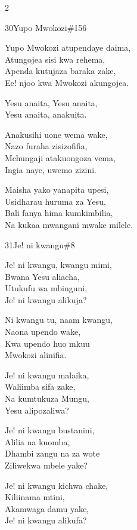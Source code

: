\begin{multicols}{2}
\begin{hymn}{30}{Yupo Mwokozi}{\#156}
\begin{stanza}
Yupo Mwokozi atupendaye daima,\\
Atungojea sisi kwa rehema,\\
Apenda kutujaza baraka zake,\\
Ee! njoo kwa Mwokozi akungojea.
\end{stanza}
\begin{chorus}
Yesu anaita, Yesu anaita,\\
Yesu anaita, anakuita.
\end{chorus}
\begin{stanza}
Anakusihi uone wema wake,\\
Nazo furaha zisizofifia,\\
Mchungaji atakuongoza vema,\\
Ingia naye, uwemo zizini.
\end{stanza}
\begin{stanza}
Maisha yako yanapita upesi,\\
Usidharau huruma za Yesu,\\
Bali fanya hima kumkimbilia,\\
Na kukaa mwangani mwake milele.
\end{stanza}
\end{hymn}

\begin{hymn}{31}{Je! ni kwangu}{\#8}
\begin{stanza}
Je! ni kwangu, kwangu mimi,\\
Bwana Yesu aliacha,\\
Utukufu wa mbinguni,\\
Je! ni kwangu alikuja?
\end{stanza}
\begin{chorus}
Ni kwangu tu, naam kwangu,\\
Naona upendo wake,\\
Kwa upendo huo mkuu\\
Mwokozi alinifia.
\end{chorus}
\begin{stanza}
Je! ni kwangu malaika,\\
Waliimba sifa zake,\\
Na kumtukuza Mungu,\\
Yesu alipozaliwa?
\end{stanza}
\begin{stanza}
Je! ni kwangu bustanini,\\
Alilia na kuomba,\\
Dhambi zangu na za wote\\
Ziliwekwa mbele yake?
\end{stanza}
\begin{stanza}
Je! ni kwangu kichwa chake,\\
Kiliinama mtini,\\
Akamwaga damu yake,\\
Je! ni kwangu alikufa?
\end{stanza}
\end{hymn}


\end{multicols}
